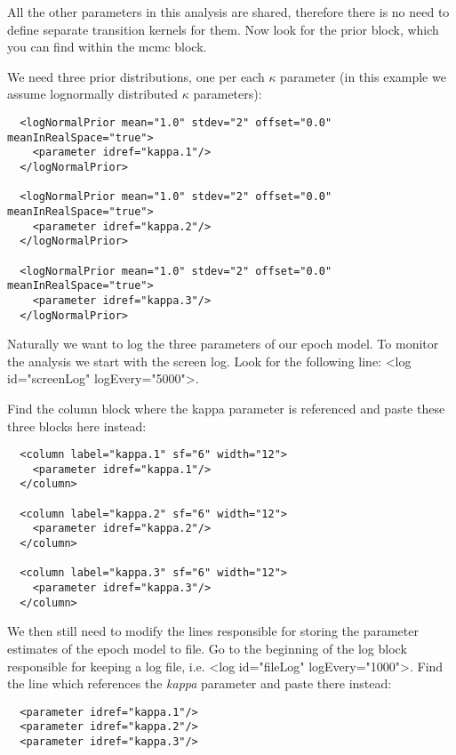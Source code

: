 All the other parameters in this analysis are shared, therefore there is no need to define separate transition kernels for them.
Now look for the {\color{darkblue}prior} block, which you can find within the {\color{darkblue}mcmc} block.

We need three prior distributions, one per each $\kappa$ parameter (in this example we assume lognormally distributed $\kappa$ parameters):

\begin{lstlisting}
  <logNormalPrior mean="1.0" stdev="2" offset="0.0" meanInRealSpace="true">
    <parameter idref="kappa.1"/>
  </logNormalPrior>
				
  <logNormalPrior mean="1.0" stdev="2" offset="0.0" meanInRealSpace="true">
    <parameter idref="kappa.2"/>
  </logNormalPrior>
				
  <logNormalPrior mean="1.0" stdev="2" offset="0.0" meanInRealSpace="true">
    <parameter idref="kappa.3"/>
  </logNormalPrior>
\end{lstlisting}

Naturally we want to log the three parameters of our epoch model. 
To monitor the analysis we start with the screen log. 
Look for the following line: <{\color{darkblue}log} {\color{darkblue}id}="screenLog" {\color{darkblue}logEvery}="5000">.

Find the {\color{darkblue}column} block where the kappa parameter is referenced and paste these three blocks here instead:

\begin{lstlisting}
  <column label="kappa.1" sf="6" width="12">
    <parameter idref="kappa.1"/>
  </column>
			
  <column label="kappa.2" sf="6" width="12">
    <parameter idref="kappa.2"/>
  </column>
			
  <column label="kappa.3" sf="6" width="12">
    <parameter idref="kappa.3"/>
  </column>
\end{lstlisting}

We then still need to modify the lines responsible for storing the parameter estimates of the epoch model to file.
Go to the beginning of the {\color{darkblue}log} block responsible for keeping a log file, i.e. <{\color{darkblue}log} {\color{darkblue}id}="fileLog" {\color{darkblue}logEvery}="1000">.
Find the line which references the \textit{kappa} parameter and paste there instead:

\begin{lstlisting}
  <parameter idref="kappa.1"/>
  <parameter idref="kappa.2"/>
  <parameter idref="kappa.3"/>
\end{lstlisting}

